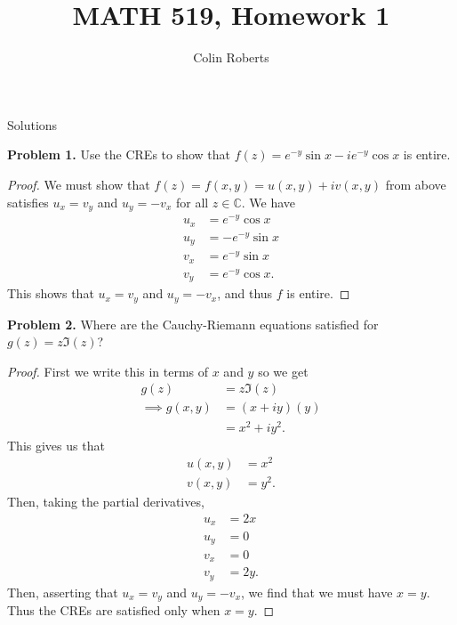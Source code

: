 \documentclass[leqno]{article}
\author{Colin Roberts}
\title{MATH 519, Homework 1}
\theoremstyle{nonumberplain}
\newtheorem{proof}{Proof}
\newcommand{\C}{\mathbb{C}}
\begin{document}
\maketitle
\begin{large}
\begin{center}
Solutions
\end{center}
\end{large}


\noindent\textbf{Problem 1.} Use the CREs to show that $f(z)=e^{-y} \sin x -ie^{-y} \cos x$ is entire.

\begin{proof}
We must show that $f(z)=f(x,y)=u(x,y)+iv(x,y)$ from above satisfies $u_x=v_y$ and $u_y=-v_x$ for all $z\in \C$.  We have
\begin{align*}
u_x&=e^{-y}\cos x\\
u_y&=-e^{-y}\sin x\\
v_x&=e^{-y}\sin x\\
v_y&=e^{-y}\cos x.
\end{align*}
This shows that $u_x=v_y$ and $u_y=-v_x$, and thus $f$ is entire.
\end{proof}

\vspace*{1cm}


\noindent\textbf{Problem 2.} Where are the Cauchy-Riemann equations satisfied for $g(z)=z\Im (z)$?

\begin{proof}
First we write this in terms of $x$ and $y$ so we get
\begin{align*}
g(z)&=z\Im (z)\\
\implies g(x,y)&=(x+iy)(y)\\
&=x^2+iy^2.
\end{align*}
This gives us that
\begin{align*}
u(x,y)&= x^2\\
v(x,y)&= y^2.
\end{align*}
Then, taking the partial derivatives,
\begin{align*}
u_x &= 2x\\
u_y &= 0\\
v_x &= 0\\
v_y &= 2y.
\end{align*}
Then, asserting that $u_x=v_y$ and $u_y=-v_x$, we find that we must have $x=y$.  Thus the CREs are satisfied only when $x=y$.
\end{proof}
\end{document}
